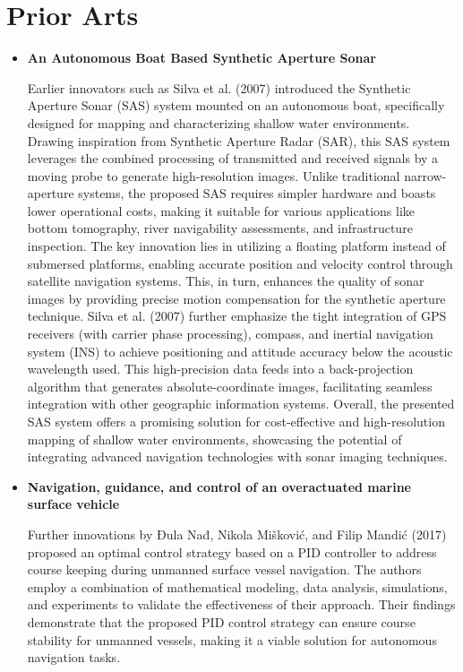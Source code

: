 \section{Prior Arts}
\begin{itemize}
\item {\bf An Autonomous Boat Based Synthetic Aperture Sonar  \cite{4449358}}

Earlier innovators such as Silva et al. (2007) introduced the Synthetic Aperture Sonar (SAS) system mounted on an 
autonomous boat, specifically designed for mapping and characterizing shallow water environments. Drawing inspiration 
from Synthetic Aperture Radar (SAR), this SAS system leverages the combined processing of transmitted and received 
signals by a moving probe to generate high-resolution images. Unlike traditional narrow-aperture systems, the proposed 
SAS requires simpler hardware and boasts lower operational costs, making it suitable for various applications like 
bottom tomography, river navigability assessments, and infrastructure inspection. The key innovation lies in utilizing 
a floating platform instead of submersed platforms, enabling accurate position and velocity control through satellite 
navigation systems. This, in turn, enhances the quality of sonar images by providing precise motion compensation for 
the synthetic aperture technique. Silva et al. (2007) further emphasize the tight integration of GPS receivers (with 
carrier phase processing), compass, and inertial navigation system (INS) to achieve positioning and attitude accuracy 
below the acoustic wavelength used. This high-precision data feeds into a back-projection algorithm that generates 
absolute-coordinate images, facilitating seamless integration with other geographic information systems. Overall, the 
presented SAS system offers a promising solution for cost-effective and high-resolution mapping of shallow water 
environments, showcasing the potential of integrating advanced navigation technologies with sonar imaging techniques.

\item {\bf Navigation, guidance, and control of an overactuated marine surface vehicle \cite{NAD2015172}}

Further innovations by Đula Nađ, Nikola Mišković, and Filip Mandić (2017) proposed an optimal control strategy based on a 
PID controller to address course keeping during unmanned surface vessel navigation. The authors employ a combination 
of mathematical modeling, data analysis, simulations, and experiments to validate the effectiveness of their approach. 
Their findings demonstrate that the proposed PID control strategy can ensure course stability for unmanned vessels, 
making it a viable solution for autonomous navigation tasks.


\end{itemize}
